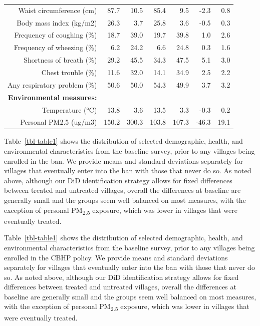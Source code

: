 \documentclass[
  letterpaper,
  DIV=11,
  numbers=noendperiod]{scrartcl}
\makeatletter
\renewenvironment{table}%
  {\renewcommand\familydefault\sfdefault
   \@float{table}}
  {\end@float}
\makeatother
\begin{document}
\begin{table}
\begin{tabular}[t]{rrrrrrr}
Waist circumference (cm) & 87.7 & 10.5 & 85.4 & 9.5 & -2.3 & 0.8\\
Body mass index (kg/m2) & 26.3 & 3.7 & 25.8 & 3.6 & -0.5 & 0.3\\
Frequency of coughing (\%) & 18.7 & 39.0 & 19.7 & 39.8 & 1.0 & 2.6\\
Frequency of wheezing (\%) & 6.2 & 24.2 & 6.6 & 24.8 & 0.3 & 1.6\\
Shortness of breath (\%) & 29.2 & 45.5 & 34.3 & 47.5 & 5.1 & 3.0\\
Chest trouble (\%) & 11.6 & 32.0 & 14.1 & 34.9 & 2.5 & 2.2\\
Any respiratory problem (\%) & 50.6 & 50.0 & 54.3 & 49.9 & 3.7 & 3.2\\
\textbf{Environmental measures:} & \textbf{} & \textbf{} & \textbf{} & \textbf{} & \textbf{} & \textbf{}\\
Temperature (°C) & 13.8 & 3.6 & 13.5 & 3.3 & -0.3 & 0.2\\
Personal PM2.5 (ug/m3) & 150.2 & 300.3 & 103.8 & 107.3 & -46.3 & 19.1\\
\bottomrule
\end{tabular}
\end{table}

Table~\ref{tbl-table1} shows the distribution of selected demographic,
health, and environmental characteristics from the baseline survey,
prior to any villages being enrolled in the ban. We provide means and
standard deviations separately for villages that eventually enter into
the ban with those that never do so. As noted above, although our DiD
identification strategy allows for fixed differences between treated and
untreated villages, overall the differences at baseline are generally
small and the groups seem well balanced on most measures, with the
exception of personal PM\textsubscript{2.5} exposure, which was lower in
villages that were eventually treated.

Table~\ref{tbl-table1} shows the distribution of selected demographic,
health, and environmental characteristics from the baseline survey,
prior to any villages being enrolled in the CBHP policy. We provide
means and standard deviations separately for villages that eventually
enter into the ban with those that never do so. As noted above, although
our DiD identification strategy allows for fixed differences between
treated and untreated villages, overall the differences at baseline are
generally small and the groups seem well balanced on most measures, with
the exception of personal PM\textsubscript{2.5} exposure, which was
lower in villages that were eventually treated.
\end{document}
